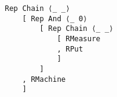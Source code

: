\centering
\begin{verbatim}
Rep Chain ⟨_ _⟩
    [ Rep And ⟨_ 0⟩
        [ Rep Chain ⟨_ _⟩
            [ RMeasure
            , RPut
            ]
        ]
    , RMachine
    ]
\end{verbatim}
\caption{}
\label{}